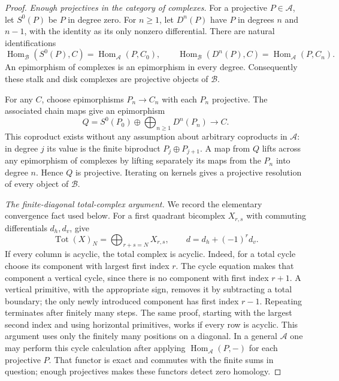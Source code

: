 \documentclass[11pt,a4paper]{article}
\theoremstyle{definition}\newtheorem{definition}[theorem]{Definition}
\theoremstyle{remark}\newtheorem{remark}[theorem]{Remark}
\begin{document}
\begin{proof}
\emph{Enough projectives in the category of complexes.}
For a projective $P\in\mathcal A$, let $S^0(P)$ be $P$ in degree zero.
For $n\geq1$, let $D^n(P)$ have $P$ in degrees $n$ and $n-1$,
with the identity as its only nonzero differential.  There are natural
identifications
\[
 \operatorname{Hom}_{\mathcal B}(S^0(P),C)
       =\operatorname{Hom}_{\mathcal A}(P,C_0),
 \qquad
 \operatorname{Hom}_{\mathcal B}(D^n(P),C)
       =\operatorname{Hom}_{\mathcal A}(P,C_n).
\]
An epimorphism of complexes is an epimorphism in every degree.
Consequently these stalk and disk complexes are projective objects of
$\mathcal B$.

For any $C$, choose epimorphisms $P_n\to C_n$ with each $P_n$
projective.  The associated chain maps give an epimorphism
\[
 Q=S^0(P_0)\oplus\bigoplus_{n\geq1}D^n(P_n)\longrightarrow C.
\]
This coproduct exists without any assumption about arbitrary
coproducts in $\mathcal A$: in degree $j$ its value is the finite
biproduct $P_j\oplus P_{j+1}$.  A map from $Q$ lifts across any
epimorphism of complexes by lifting separately its maps from the
$P_n$ into degree $n$.  Hence $Q$ is projective.  Iterating on kernels
gives a projective resolution of every object of $\mathcal B$.

\emph{The finite-diagonal total-complex argument.}
We record the elementary convergence fact used below.  For a first
quadrant bicomplex $X_{r,s}$ with commuting differentials $d_h,d_v$,
give
\[
 \operatorname{Tot}(X)_N=\bigoplus_{r+s=N}X_{r,s},
 \qquad d=d_h+(-1)^r d_v.
\]
If every column is acyclic, the total complex is acyclic.  Indeed, for
a total cycle choose its component with largest first index $r$.
The cycle equation makes that component a vertical cycle, since there
is no component with first index $r+1$.  A vertical primitive, with
the appropriate sign, removes it by subtracting a total boundary;
the only newly introduced component has first index $r-1$.  Repeating
terminates after finitely many steps.  The same proof, starting with
the largest second index and using horizontal primitives, works if
every row is acyclic.  This argument uses only the finitely many
positions on a diagonal.  In a general $\mathcal A$ one may perform
this cycle calculation after applying
$\operatorname{Hom}_{\mathcal A}(P,-)$ for each projective $P$.
That functor is exact and commutes with the finite sums in question;
enough projectives makes these functors detect zero homology.


\end{proof}
\end{document}
